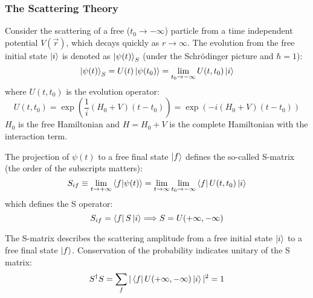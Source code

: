 \subsubsection{The Scattering Theory}
Consider the scattering of a free ($t_0 \rightarrow -\infty$) particle from a 
time independent potential $V(\vec{r})$, 
which decays quickly as $r \rightarrow \infty$. The evolution from the free initial state
$\ket{i}$ is denoted as $\ket{\psi(t)}_S$ (under the Schr\"odinger picture and $\hbar = 1$):
\begin{equation}
    \ket{\psi(t)}_S = U(t)\ket{\psi(t_0)} = \lim_{t_0 \rightarrow -\infty}U(t, t_0)\ket{i}
\end{equation}
where $U(t, t_0)$ is the evolution operator:
\begin{equation}
    U(t, t_0) = \exp(\frac{1}{i}(H_0 + V)(t - t_0)) = \exp(-i(H_0 + V)(t-t_0))
\end{equation}
$H_0$ is the free Hamiltonian and $H = H_0 + V$ is the complete Hamiltonian
with the interaction term. 

The projection of $\psi(t)$ to a free final state $\ket{f}$ defines the so-called
S-matrix (the order of the subscripts matters):
\begin{equation}
    S_{if} \equiv \lim_{t\rightarrow +\infty}\bra{f}\ket{\psi(t)} 
    = \lim_{t\rightarrow\infty} \lim_{t_0 \rightarrow -\infty} \bra{f} U(t, t_0) \ket{i}
\end{equation}
which defines the S operator:
\begin{equation}
    S_{if} = \bra{f} S \ket{i} \Longrightarrow S = U(+\infty, -\infty)
\end{equation}

The S-matrix describes the scattering amplitude from a free initial state $\ket{i}$
to a free final state $\ket{f}$. Conservation of the probability indicates
unitary of the S matrix:
\begin{equation}
    S^\dag S = \sum_f |\bra{f} U(+\infty, -\infty) \ket{i}|^2 = 1
\end{equation}

